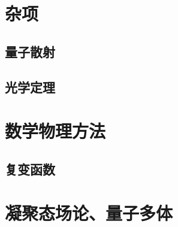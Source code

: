 \documentclass{article}
\begin{document}
\chapter{杂项}
\section{量子散射}

\section{光学定理}
\chapter{数学物理方法}
\section{复变函数}
\chapter{凝聚态场论、量子多体}
\end{document}
